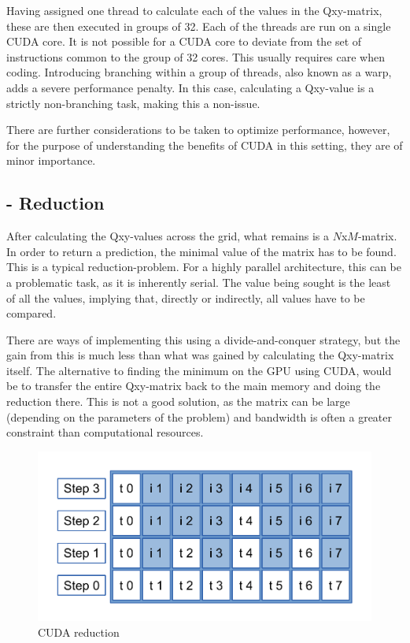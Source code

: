 \documentclass[10pt,a4paper]{book}
\begin{document}
Having assigned one thread to calculate each of the values in the Qxy-matrix, these are then executed in groups of 32. Each of the threads are run on a single \gls{CUDA} core. It is not possible for a \gls{CUDA} core to deviate from the set of instructions common to the group of 32 cores. This usually requires care when coding. Introducing branching within a group of threads, also known as a warp, adds a severe performance penalty. In this case, calculating a Qxy-value is a strictly non-branching task, making this a non-issue.

There are further considerations to be taken to optimize performance, however, for the purpose of understanding the benefits of \gls{CUDA} in this setting, they are of minor importance. 

\newpage

\subsection{  - Reduction}

After calculating the Qxy-values across the grid, what remains is a $N$x$M$-matrix. In order to return a prediction, the minimal value of the matrix has to be found. This is a typical reduction-problem. For a highly parallel architecture, this can be a problematic task, as it is inherently serial. The value being sought is the least of all the values, implying that, directly or indirectly, all values have to be compared.

There are ways of implementing this using a divide-and-conquer strategy, but the gain from this is much less than what was gained by calculating the Qxy-matrix itself. The alternative to finding the minimum on the \gls{GPU} using \gls{CUDA}, would be to transfer the entire Qxy-matrix back to the main memory and doing the reduction there. This is not a good solution, as the matrix can be large (depending on the parameters of the problem) and bandwidth is often a greater constraint than computational resources.

\begin{figure}[H]
\centering
\includegraphics[width=120mm]{cudareduction.pdf}
\caption{\gls{CUDA} reduction}
\label{cudareduction}
\end{figure}
\end{document}
